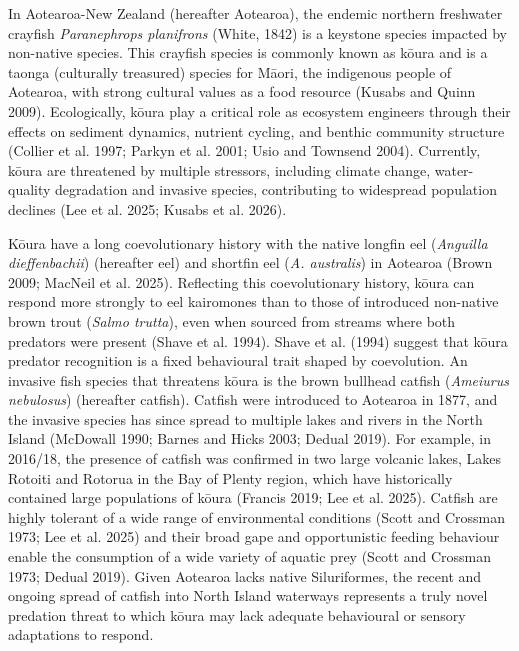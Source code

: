 \documentclass[
  12pt,
  a4paper,
  oneside]{scrbook}
\begin{document}
In Aotearoa-New Zealand (hereafter Aotearoa), the endemic northern
freshwater crayfish \emph{Paranephrops planifrons} (White, 1842) is a
keystone species impacted by non-native species. This crayfish species
is commonly known as kōura and is a taonga (culturally treasured)
species for Māori, the indigenous people of Aotearoa, with strong
cultural values as a food resource (Kusabs and Quinn 2009).
Ecologically, kōura play a critical role as ecosystem engineers through
their effects on sediment dynamics, nutrient cycling, and benthic
community structure (Collier et al. 1997; Parkyn et al. 2001; Usio and
Townsend 2004). Currently, kōura are threatened by multiple stressors,
including climate change, water-quality degradation and invasive
species, contributing to widespread population declines (Lee et al.
2025; Kusabs et al. 2026).

Kōura have a long coevolutionary history with the native longfin eel
(\emph{Anguilla dieffenbachii}) (hereafter eel) and shortfin eel
(\emph{A. australis}) in Aotearoa (Brown 2009; MacNeil et al. 2025).
Reflecting this coevolutionary history, kōura can respond more strongly
to eel kairomones than to those of introduced non-native brown trout
(\emph{Salmo trutta}), even when sourced from streams where both
predators were present (Shave et al. 1994). Shave et al. (1994) suggest
that kōura predator recognition is a fixed behavioural trait shaped by
coevolution. An invasive fish species that threatens kōura is the brown
bullhead catfish (\emph{Ameiurus nebulosus}) (hereafter catfish).
Catfish were introduced to Aotearoa in 1877, and the invasive species
has since spread to multiple lakes and rivers in the North Island
(McDowall 1990; Barnes and Hicks 2003; Dedual 2019). For example, in
2016/18, the presence of catfish was confirmed in two large volcanic
lakes, Lakes Rotoiti and Rotorua in the Bay of Plenty region, which have
historically contained large populations of kōura (Francis 2019; Lee et
al. 2025). Catfish are highly tolerant of a wide range of environmental
conditions (Scott and Crossman 1973; Lee et al. 2025) and their broad
gape and opportunistic feeding behaviour enable the consumption of a
wide variety of aquatic prey (Scott and Crossman 1973; Dedual 2019).
Given Aotearoa lacks native Siluriformes, the recent and ongoing spread
of catfish into North Island waterways represents a truly novel
predation threat to which kōura may lack adequate behavioural or sensory
adaptations to respond.
\end{document}
